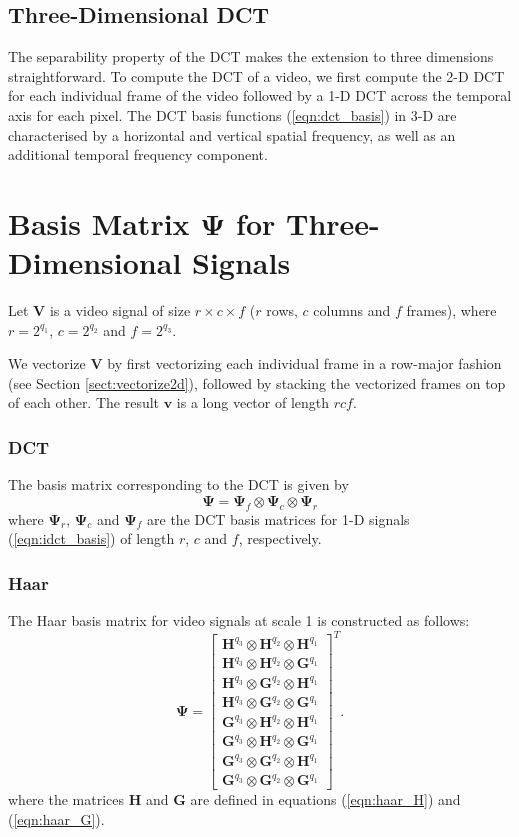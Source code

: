 \subsection{Three-Dimensional DCT}
The separability property of the DCT makes the extension to three dimensions straightforward.
To compute the DCT of a video, we first compute the 2-D DCT for each individual frame of the video followed by a 1-D DCT across the temporal axis for each pixel.
The DCT basis functions (\ref{eqn:dct_basis}) in 3-D are characterised by a horizontal and vertical spatial frequency, as well as an additional temporal frequency component.

\section{Basis Matrix \texorpdfstring{$\bm\Psi$}{[Psi]} for Three-Dimensional Signals}
Let $\bm V$ is a video signal of size $r\times c\times f$ ($r$ rows, $c$ columns and $f$ frames), where $r=2^{q_1}$, $c=2^{q_2}$ and $f=2^{q_3}$.

We vectorize $\bm V$ by first vectorizing each individual frame in a row-major fashion (see Section \ref{sect:vectorize2d}), followed by stacking the vectorized frames on top of each other.
The result $\bm v$ is a long vector of length $rcf$.

\subsubsection{DCT}
The basis matrix corresponding to the DCT is given by 
\begin{equation*}
  \bm\Psi = \bm\Psi_f\otimes\bm\Psi_c\otimes\bm\Psi_r
\end{equation*}
where $\bm\Psi_r$, $\bm\Psi_c$ and $\bm\Psi_f$ are the DCT basis matrices for 1-D signals (\ref{eqn:idct_basis}) of length $r$, $c$ and $f$, respectively.

\subsubsection{Haar}
The Haar basis matrix for video signals at scale 1 is constructed as follows:
\begin{equation*}
  \bm\Psi = 
  \begin{bmatrix}
    \bm H^{q_3}\otimes \bm H^{q_2} \otimes\bm H^{q_1} \\
    \bm H^{q_3}\otimes \bm H^{q_2} \otimes \bm G^{q_1} \\
    \bm H^{q_3}\otimes \bm G^{q_2} \otimes \bm H^{q_1} \\
    \bm H^{q_3}\otimes \bm G^{q_2} \otimes \bm G^{q_1} \\
    \bm G^{q_3}\otimes \bm H^{q_2} \otimes\bm H^{q_1} \\
    \bm G^{q_3}\otimes \bm H^{q_2} \otimes \bm G^{q_1} \\
    \bm G^{q_3}\otimes \bm G^{q_2} \otimes \bm H^{q_1} \\
    \bm G^{q_3}\otimes \bm G^{q_2} \otimes \bm G^{q_1} 
  \end{bmatrix}^T.
\end{equation*}
where the matrices $\bm H$ and $\bm G$ are defined in equations (\ref{eqn:haar_H}) and (\ref{eqn:haar_G}).


